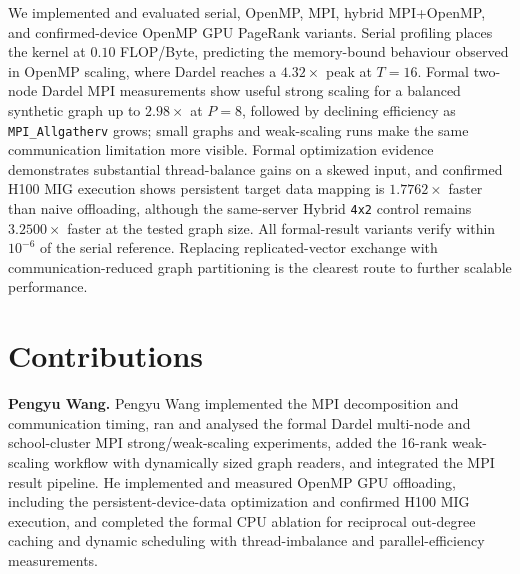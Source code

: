 \documentclass[11pt]{article}
\begin{document}
We implemented and evaluated serial, OpenMP, MPI, hybrid MPI+OpenMP,
and confirmed-device OpenMP GPU PageRank variants. Serial profiling
places the kernel at $0.10$ FLOP/Byte, predicting the memory-bound
behaviour observed in OpenMP scaling, where Dardel reaches a
$4.32\times$ peak at $T=16$. Formal two-node Dardel MPI measurements
show useful strong scaling for a balanced synthetic graph up to
$2.98\times$ at $P=8$, followed by declining efficiency as
\texttt{MPI\_Allgatherv} grows; small graphs and weak-scaling runs make
the same communication limitation more visible. Formal optimization
evidence demonstrates substantial thread-balance gains on a skewed
input, and confirmed H100 MIG execution shows persistent target data
mapping is $1.7762\times$ faster than naive offloading, although the
same-server Hybrid \texttt{4x2} control remains $3.2500\times$ faster
at the tested graph size. All formal-result variants verify within
$10^{-6}$ of the serial reference. Replacing replicated-vector exchange
with communication-reduced graph partitioning is the clearest route to
further scalable performance.

\section*{Contributions}
\label{sec:contrib}

\noindent\textbf{Pengyu Wang.}
Pengyu Wang implemented the MPI decomposition and communication timing,
ran and analysed the formal Dardel multi-node and school-cluster MPI
strong/weak-scaling experiments, added the 16-rank weak-scaling workflow
with dynamically sized graph readers, and integrated the MPI result
pipeline. He implemented and measured OpenMP GPU offloading, including
the persistent-device-data optimization and confirmed H100 MIG
execution, and completed the formal CPU ablation for reciprocal
out-degree caching and dynamic scheduling with thread-imbalance and
parallel-efficiency measurements.

\end{document}
